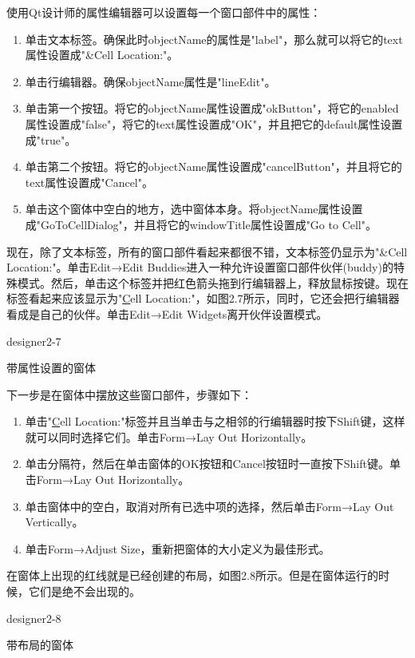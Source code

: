\documentclass[11pt,oneside]{book}
\begin{document}
\begin{common-format}
使用Qt设计师的属性编辑器可以设置每一个窗口部件中的属性：
\begin{enumerate}
\item 单击文本标签。确保此时objectName的属性是"label"，那么就可以将它的text属性设置成"\&{}Cell Location:"。
\item 单击行编辑器。确保objectName属性是"lineEdit"。
\item 单击第一个按钮。将它的objectName属性设置成"okButton"，将它的enabled属性设置成"false"，将它的text属性设置成"OK"，并且把它的default属性设置成"true"。
\item 单击第二个按钮。将它的objectName属性设置成"cancelButton"，并且将它的text属性设置成"Cancel"。
\item 单击这个窗体中空白的地方，选中窗体本身。将objectName属性设置成"GoToCellDialog"，并且将它的windowTitle属性设置成"Go to Cell"。
\end{enumerate}

现在，除了文本标签，所有的窗口部件看起来都很不错，文本标签仍显示为"\&{}Cell Location:"。单击Edit→Edit Buddies进入一种允许设置窗口部件伙伴(buddy)的特殊模式。然后，单击这个标签并把红色箭头拖到行编辑器上，释放鼠标按键。现在标签看起来应该显示为"\uline{C}ell Location:"，如图2.7所示，同时，它还会把行编辑器看成是自己的伙伴。单击Edit→Edit Widgets离开伙伴设置模式。

\begin{fig}[0.7]{designer2-7}
\caption{带属性设置的窗体}
\label{fig:designer2-7}
\end{fig}

下一步是在窗体中摆放这些窗口部件，步骤如下：
\begin{enumerate}
\item 单击"\uline{C}ell Location:"标签并且当单击与之相邻的行编辑器时按下Shift键，这样就可以同时选择它们。单击Form→Lay Out Horizontally。
\item 单击分隔符，然后在单击窗体的OK按钮和Cancel按钮时一直按下Shift键。单击Form→Lay Out Horizontally。
\item 单击窗体中的空白，取消对所有已选中项的选择，然后单击Form→Lay Out Vertically。
\item 单击Form→Adjust Size，重新把窗体的大小定义为最佳形式。
\end{enumerate}

在窗体上出现的红线就是已经创建的布局，如图2.8所示。但是在窗体运行的时候，它们是绝不会出现的。
\begin{fig}[0.7]{designer2-8}
\caption{带布局的窗体}
\label{fig:designer2-8}
\end{fig}


\end{common-format}
\end{document}
